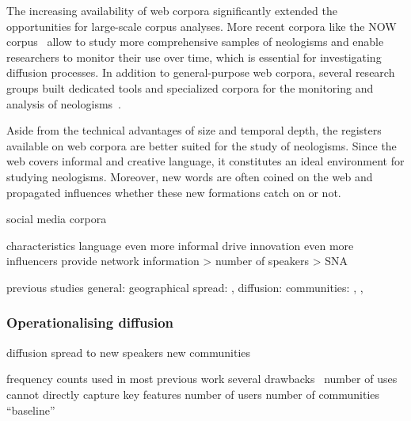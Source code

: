 \documentclass[
  a4paper,
  abstract=on,
  captions=tableabove
  ]{scrartcl}
\begin{document}
      The increasing availability of web corpora significantly extended the opportunities for large-scale corpus analyses. More recent corpora like the NOW corpus~\parencite{Davies2013CorpusNews} allow to study more comprehensive samples of neologisms and enable researchers to monitor their use over time, which is essential for investigating diffusion processes. In addition to general-purpose web corpora, several research groups built dedicated tools and specialized corpora for the monitoring and analysis of neologisms~\parencite{Renouf2006WebCorpIntegrated, Kerremans2012NeoCrawlerIdentifying,LemnitzerWortwarte,Gerard2017LogoscopeSemiautomatic,Cartier2017NeoveilleWeb}.

      Aside from the technical advantages of size and temporal depth, the registers available on web corpora are better suited for the study of neologisms. Since the web covers informal and creative language, it constitutes an ideal environment for studying neologisms. Moreover, new words are often coined on the web and propagated
        influences whether these new formations catch on or not.


          social media corpora

            characteristics
              language even more informal
              drive innovation even more
                influencers
              provide network information > number of speakers > SNA

            previous studies
              general: \textcite{Grieve2016AnalyzingLexical} 
              geographical spread: \textcite{Eisenstein2014DiffusionLexical}, 
              diffusion: \textcite{Nini2017ApplicationGrowth} 
              communities: \textcite{Stewart2018MakingFetch}, \textcite{Ryskina2020WhereNew}, \textcite{DelTredici2018RoadSuccess} 
    
    \subsubsection{Operationalising diffusion}
    
      diffusion
        spread to
          new speakers
          new communities
          
      frequency counts
        used in most previous work
        several drawbacks~\parencite{Stefanowitsch2017CorpusbasedPerspective}
          number of uses cannot directly capture key features
            number of users
            number of communities
        \enquote{baseline}
\end{document}
